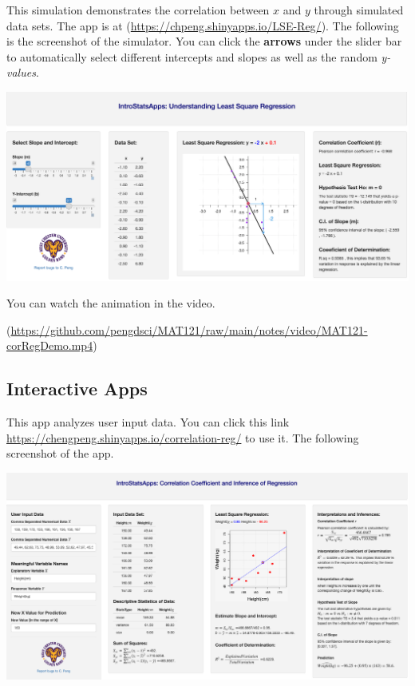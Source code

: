 \documentclass[
]{book}
\begin{document}
This simulation demonstrates the correlation between \(x\) and \(y\) through simulated data sets. The app is at (\url{https://chpeng.shinyapps.io/LSE-Reg/}). The following is the screenshot of the simulator. You can click the \textbf{arrows} under the slider bar to automatically select different intercepts and slopes as well as the random \emph{y-values}.

\begin{center}\includegraphics[width=1\linewidth]{week12/corRegDemo} \end{center}

You can watch the animation in the video.

(\url{https://github.com/pengdsci/MAT121/raw/main/notes/video/MAT121-corRegDemo.mp4})

\hypertarget{interactive-apps}{%
\subsection{Interactive Apps}\label{interactive-apps}}

This app analyzes user input data. You can click this link \url{https://chengpeng.shinyapps.io/correlation-reg/} to use it. The following screenshot of the app.

\begin{center}\includegraphics[width=1\linewidth]{week12/corRegAnalyzer} \end{center}
\end{document}

